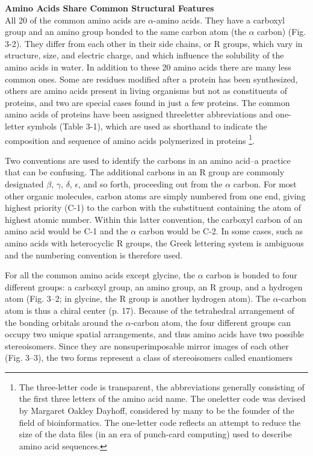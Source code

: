 \textbf{Amino Acids Share Common Structural Features}\\
All 20 of the common amino acids are  $\alpha$-amino acids. They have a carboxyl group and an amino group bonded to the same carbon atom (the  $\alpha$ carbon) (Fig. 3-2). They differ from each other in their side chains, or R groups, which vary in structure, size, and electric charge, and which influence the solubility of the amino acids in water. In addition to these 20 amino acids there are many less common ones. Some are residues modified after a protein has been synthesized, others are amino acids present in living organisms but not as constituents of proteins, and two are special cases found in just a few proteins. The common amino acids of proteins have been assigned threeletter abbreviations and one-letter symbols (Table 3-1), which are used as shorthand to indicate the composition and sequence of amino acids polymerized in proteins \footnote{The three-letter code is transparent, the abbreviations generally consisting of the first three letters of the amino acid name. The oneletter code was devised by Margaret Oakley Dayhoff, considered by many to be the founder of the field of bioinformatics. The one-letter code reflects an attempt to reduce the size of the data files (in an era of punch-card computing) used to describe amino acid sequences.}.

Two conventions are used to identify the carbons in an amino acid--a practice that can be confusing. The additional carbons in an R group are commonly designated $\beta$, $\gamma$, $\delta$, $\epsilon$, and so forth, proceeding out from the  $\alpha$ carbon. For most other organic molecules, carbon atoms are simply numbered from one end, giving highest priority (C-1) to the carbon with the substituent containing the atom of highest atomic number. Within this latter convention, the carboxyl carbon of an amino acid would be C-1 and the  $\alpha$ carbon would be C-2. In some cases, such as amino acids with heterocyclic R groups, the Greek lettering system is ambiguous and the numbering convention is therefore used.

For all the common amino acids except glycine, the  $\alpha$ carbon is bonded to four different groups: a carboxyl group, an amino group, an R group, and a hydrogen atom (Fig. 3--2; in glycine, the R group is another hydrogen atom). The  $\alpha$-carbon atom is thus a chiral center (p. 17). Because of the tetrahedral arrangement of the bonding orbitals around the  $\alpha$-carbon atom, the four different groups can occupy two unique spatial arrangements, and thus amino acids have two possible stereoisomers. Since they are nonsuperimposable mirror images of each other (Fig. 3--3), the two forms represent a class of stereoisomers called enantiomers

